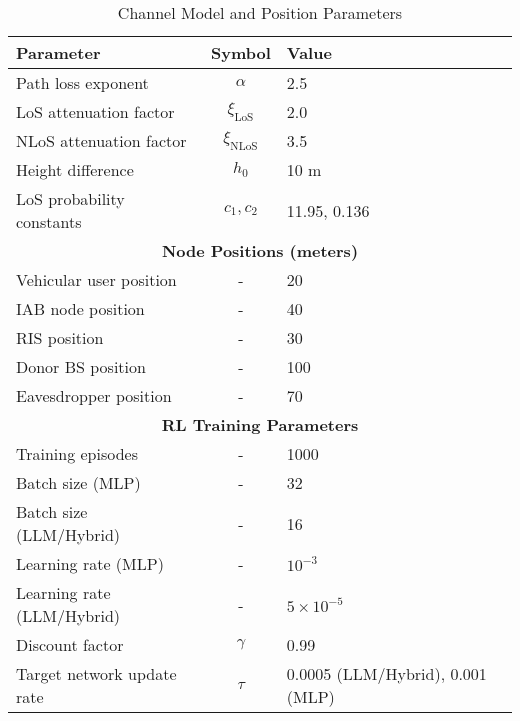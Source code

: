 \begin{table}[!t]
\centering
\caption{Channel Model and Position Parameters}
\label{tab:channel_params}
\begin{tabular}{|l|c|l|}
\hline
\textbf{Parameter} & \textbf{Symbol} & \textbf{Value} \\
\hline
Path loss exponent & $\alpha$ & 2.5 \\
LoS attenuation factor & $\xi_{\text{LoS}}$ & 2.0 \\
NLoS attenuation factor & $\xi_{\text{NLoS}}$ & 3.5 \\
Height difference & $h_0$ & 10 m \\
LoS probability constants & $c_1, c_2$ & 11.95, 0.136 \\
\hline
\multicolumn{3}{|c|}{\textbf{Node Positions (meters)}} \\
\hline
Vehicular user position & - & 20 \\
IAB node position & - & 40 \\
RIS position & - & 30 \\
Donor BS position & - & 100 \\
Eavesdropper position & - & 70 \\
\hline
\multicolumn{3}{|c|}{\textbf{RL Training Parameters}} \\
\hline
Training episodes & - & 1000 \\
Batch size (MLP) & - & 32 \\
Batch size (LLM/Hybrid) & - & 16 \\
Learning rate (MLP) & - & $10^{-3}$ \\
Learning rate (LLM/Hybrid) & - & $5 \times 10^{-5}$ \\
Discount factor & $\gamma$ & 0.99 \\
Target network update rate & $\tau$ & 0.0005 (LLM/Hybrid), 0.001 (MLP) \\
\hline
\end{tabular}
\end{table}
